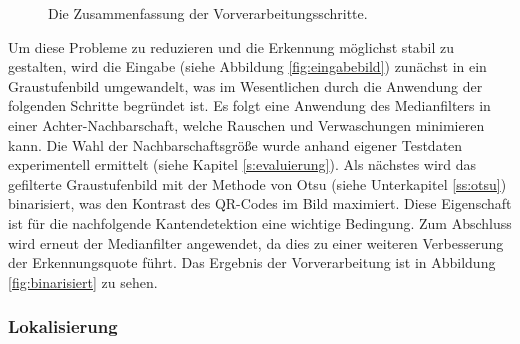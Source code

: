 \documentclass[a4paper, oneside, 12pt]{article}
\begin{document}
\begin{figure}[h]
	\begin{center}
	\end{center}
	\caption{Die Zusammenfassung der Vorverarbeitungsschritte.}
	\label{fig:vorverarbeitung}
\end{figure}

Um diese Probleme zu reduzieren und die Erkennung möglichst stabil zu gestalten, wird die Eingabe (siehe Abbildung \ref{fig:eingabebild}) zunächst in ein Graustufenbild umgewandelt, was im Wesentlichen durch die Anwendung der folgenden Schritte begründet ist.
Es folgt eine Anwendung des Medianfilters in einer Achter-Nachbarschaft, welche Rauschen und Verwaschungen minimieren kann. Die Wahl der Nachbarschaftsgröße wurde anhand eigener Testdaten experimentell ermittelt (siehe Kapitel \ref{s:evaluierung}).
Als nächstes wird das gefilterte Graustufenbild mit der Methode von Otsu (siehe Unterkapitel \ref{ss:otsu}) binarisiert, was den Kontrast des QR-Codes im Bild maximiert. Diese Eigenschaft ist für die nachfolgende Kantendetektion eine wichtige Bedingung.
Zum Abschluss wird erneut der Medianfilter angewendet, da dies zu einer weiteren Verbesserung der Erkennungsquote führt.
Das Ergebnis der Vorverarbeitung ist in Abbildung \ref{fig:binarisiert} zu sehen.

\subsubsection{Lokalisierung}
\end{document}
